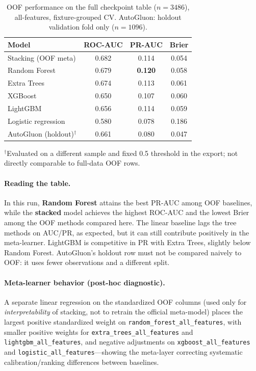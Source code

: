 \documentclass[11pt, a4paper]{article}
\begin{document}
\begin{table}[h]
\centering
\caption{OOF performance on the full checkpoint table ($n=3486$), all-features, fixture-grouped CV. AutoGluon: holdout validation fold only ($n=1096$).}
\label{tab:model_results}
\begin{tabular}{lccc}
\toprule
\textbf{Model} & \textbf{ROC-AUC} & \textbf{PR-AUC} & \textbf{Brier} \\
\midrule
Stacking (OOF meta)     & 0.682 & 0.114 & 0.054 \\
Random Forest           & 0.679 & \textbf{0.120} & 0.058 \\
Extra Trees             & 0.674 & 0.113 & 0.061 \\
XGBoost                 & 0.650 & 0.107 & 0.060 \\
LightGBM                & 0.656 & 0.114 & 0.059 \\
Logistic regression     & 0.580 & 0.078 & 0.186 \\
\midrule
AutoGluon (holdout)$^\dagger$ & 0.661 & 0.080 & 0.047 \\
\bottomrule
\end{tabular}

{\footnotesize $^\dagger$Evaluated on a different sample and fixed 0.5 threshold in the export; not directly comparable to full-data OOF rows.}
\end{table}

\paragraph{Reading the table.} In this run, \textbf{Random Forest} attains the best PR-AUC among OOF baselines, while the \textbf{stacked} model achieves the highest ROC-AUC and the lowest Brier among the OOF methods compared here. The linear baseline lags the tree methods on AUC/PR, as expected, but it can still contribute positively in the meta-learner. LightGBM is competitive in PR with Extra Trees, slightly below Random Forest. AutoGluon's holdout row must not be compared naively to OOF: it uses fewer observations and a different split.

\paragraph{Meta-learner behavior (post-hoc diagnostic).} A separate linear regression on the standardized OOF columns (used only for \emph{interpretability} of stacking, not to retrain the official meta-model) places the largest positive standardized weight on \texttt{random\_forest\_all\_features}, with smaller positive weights for \texttt{extra\_trees\_all\_features} and \texttt{lightgbm\_all\_features}, and negative adjustments on \texttt{xgboost\_all\_features} and \texttt{logistic\_all\_features}---showing the meta-layer correcting systematic calibration/ranking differences between baselines.
\end{document}
